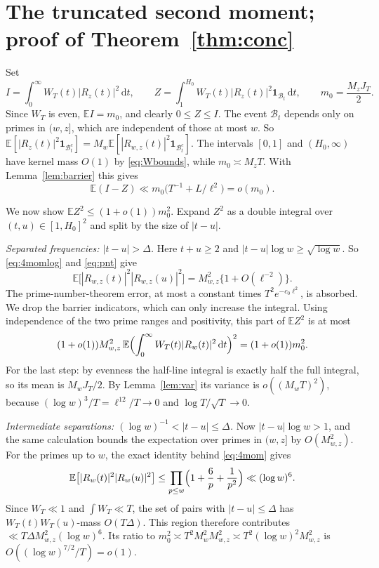 \documentclass[11pt]{amsart}
\theoremstyle{remark}
\numberwithin{equation}{section}
\newcommand{\E}{\mathbb{E}}
\newcommand{\one}{\mathbf{1}}
\newcommand{\dd}{\,\mathrm{d}}
\begin{document}
\section{The truncated second moment; proof of Theorem~\ref{thm:conc}}\label{sec:concproof}

Set
\[
I=\int_0^\infty W_T(t)|R_z(t)|^2\dd t,\qquad Z=\int_1^{H_0}W_T(t)|R_z(t)|^2\one_{\mathcal B_t}\dd t,\qquad m_0=\frac{M_zJ_T}{2}.
\]
Since $W_T$ is even, $\E I=m_0$, and clearly $0\le Z\le I$. The event $\mathcal B_t$ depends only on primes in $(w,z]$, which are independent of those at most $w$. So $\E[|R_z(t)|^2\one_{\mathcal B_t^c}]=M_w\E[|R_{w,z}(t)|^2\one_{\mathcal B_t^c}]$. The intervals $[0,1]$ and $(H_0,\infty)$ have kernel mass $O(1)$ by \eqref{eq:Wbounds}, while $m_0\asymp M_zT$. With Lemma~\ref{lem:barrier} this gives
\begin{equation}\label{eq:IminusZ}
\E(I-Z)\ll m_0\bigl(T^{-1}+L/\ell^2\bigr)=o(m_0).
\end{equation}

We now show $\E Z^2\le(1+o(1))m_0^2$. Expand $Z^2$ as a double integral over $(t,u)\in[1,H_0]^2$ and split by the size of $|t-u|$.

\medskip\noindent\emph{Separated frequencies: $|t-u|>\Delta$.} Here $t+u\ge2$ and $|t-u|\log w\ge\sqrt{\log w}$. So \eqref{eq:4momlog} and \eqref{eq:pnt} give
\[
\E\bigl[|R_{w,z}(t)|^2|R_{w,z}(u)|^2\bigr]=M_{w,z}^2\{1+O(\ell^{-2})\}.
\]
The prime-number-theorem error, at most a constant times $T^2e^{-c_0\ell^2}$, is absorbed. We drop the barrier indicators, which can only increase the integral. Using independence of the two prime ranges and positivity, this part of $\E Z^2$ is at most
\[
(1+o(1))M_{w,z}^2\,\E\Bigl(\int_0^\infty W_T(t)|R_w(t)|^2\dd t\Bigr)^2=(1+o(1))m_0^2 .
\]
For the last step: by evenness the half-line integral is exactly half the full integral, so its mean is $M_wJ_T/2$. By Lemma~\ref{lem:var} its variance is $o((M_wT)^2)$, because $(\log w)^3/T=\ell^{12}/T\to0$ and $\log T/\sqrt T\to0$.

\medskip\noindent\emph{Intermediate separations: $(\log w)^{-1}<|t-u|\le\Delta$.} Now $|t-u|\log w>1$, and the same calculation bounds the expectation over primes in $(w,z]$ by $O(M_{w,z}^2)$. For the primes up to $w$, the exact identity behind \eqref{eq:4mom} gives
\begin{equation}\label{eq:low4}
\E\bigl[|R_w(t)|^2|R_w(u)|^2\bigr]\le\prod_{p\le w}\Bigl(1+\frac6p+\frac1{p^2}\Bigr)\ll(\log w)^6 .
\end{equation}
Since $W_T\ll1$ and $\int W_T\ll T$, the set of pairs with $|t-u|\le\Delta$ has $W_T(t)W_T(u)$-mass $O(T\Delta)$. This region therefore contributes $\ll T\Delta M_{w,z}^2(\log w)^6$. Its ratio to $m_0^2\asymp T^2M_w^2M_{w,z}^2\asymp T^2(\log w)^2M_{w,z}^2$ is $O((\log w)^{7/2}/T)=o(1)$.
\end{document}
